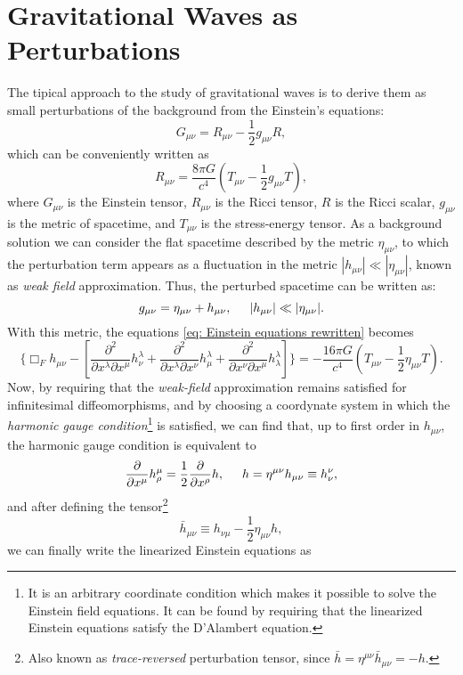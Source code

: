 \section{Gravitational Waves as Perturbations}
The tipical approach to the study of gravitational waves is to derive them as small perturbations of the background from the Einstein's equations: 
\begin{equation}
    G_{\mu\nu} = R_{\mu\nu} - \frac{1}{2}g_{\mu\nu}R,
\end{equation}
which can be conveniently written as 
\begin{equation}
    R_{\mu\nu}=\frac{8\pi G}{c^4}\left(T_{\mu\nu} - \frac{1}{2}g_{\mu\nu}T\right),
    \label{eq: Einstein equations rewritten}
\end{equation}
where $G_{\mu\nu}$ is the Einstein tensor, $R_{\mu\nu}$ is the Ricci tensor, $R$ is the Ricci scalar, $g_{\mu\nu}$ is the metric of spacetime, and $T_{\mu\nu}$ is the stress-energy tensor.
As a background solution we can consider the flat spacetime described by the metric $\eta_{\mu\nu}$, to which the perturbation term appears as a fluctuation in the metric $|h_{\mu\nu}|\ll|\eta_{\mu\nu}|$, known as \textit{weak field} approximation. Thus, the perturbed spacetime can be written as:
\[
    g_{\mu\nu} = \eta_{\mu\nu} + h_{\mu\nu}, \hspace{5mm}  |h_{\mu\nu}|\ll|\eta_{\mu\nu}|.
\] 
With this metric, the equations \ref{eq: Einstein equations rewritten} becomes
\[
    \{\Box_F h_{\mu\nu} - \left[\frac{\partial^2}{\partial x^\lambda\partial x^\mu}h^\lambda_\nu + \frac{\partial^2}{\partial x^\lambda\partial x^\nu}h^\lambda_\mu + \frac{\partial^2}{\partial x^\nu\partial x^\mu}h^\lambda_\lambda\right]\} = -\frac{16\pi G}{c^4}\left(T_{\mu\nu} - \frac{1}{2}\eta_{\mu\nu}T\right).
\]
Now, by requiring that the \textit{weak-field} approximation remains satisfied for infinitesimal diffeomorphisms, and by choosing a coordynate system in which the \textit{harmonic gauge condition}\footnote{It is an arbitrary coordinate condition which makes it possible to solve the Einstein field equations. It can be found by requiring that the linearized Einstein equations satisfy the D'Alambert equation.} is satisfied, we can find that, up to first order in $h_{\mu\nu}$, the harmonic gauge condition is equivalent to 
\begin{equation}
    \frac{\partial}{\partial x^\mu}h^\mu_\rho = \frac{1}{2}\frac
    {\partial}{\partial x^\rho}h, \hspace{5mm} h=\eta^{\mu\nu}h_{\mu\nu}\equiv h^\nu_\nu,
\end{equation}
and after defining the tensor\footnote{Also known as \textit{trace-reversed} perturbation tensor, since $\bar{h}=\eta^{\mu\nu}\bar{h}_{\mu\nu} = -h$.}
\[
    \bar{h}_{\mu\nu} \equiv h_{\nu\mu} - \frac{1}{2}\eta_{\mu\nu}h,
\]
we can finally write the linearized Einstein equations as

